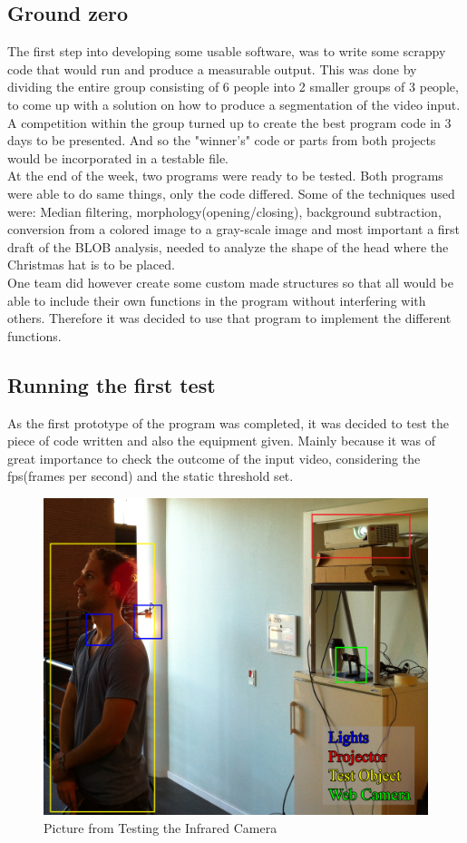 \subsection{Ground zero}
The first step into developing some usable software, was to write some scrappy code that would run and produce a measurable output. This was done by dividing the entire group consisting of 6 people into 2 smaller groups of 3 people, to come up with a solution on how to produce a segmentation of the video input. A competition within the group turned up to create the best program code in 3 days to be presented. And so the "winner's" code or parts from both projects would be incorporated in a testable file.\\
At the end of the week, two programs were ready to be tested. Both programs were able to do same things, only the code differed. Some of the techniques used were: Median filtering, morphology(opening/closing), background subtraction, conversion from a colored image to a gray-scale image and most important a first draft of the BLOB analysis, needed to analyze the shape of the head where the Christmas hat is to be placed.\\
One team did however create some custom made structures so that all would be able to include their own functions in the program without interfering with others. Therefore it was decided to use that program to implement the different functions.

\subsection{Running the first test}
As the first prototype of the program was completed, it was decided to test the piece of code written and also the equipment given. Mainly because it was of great importance to check the outcome of the input video, considering the fps(frames per second) and the static threshold set. 

\begin{figure}[htbp]
\centering
\includegraphics[width=1.00\textwidth]{Pictures/Test/TestSetup.jpg}
\caption{Picture from Testing the Infrared Camera}
\label{fig:Picture from Testing the Infrared Camera}
\end{figure} 


